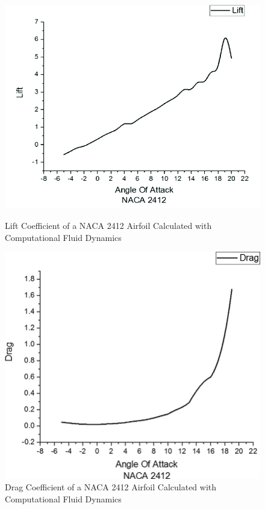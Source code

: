 \documentclass{article}
\begin{document}
\begin{figure}[h]
    \centering
\begin{minipage}[b]{0.45\textwidth}
\centering
\includegraphics[width=\textwidth]{CFD 2412 Lift.png}
\caption{\label{fig:CFD NACA 2412 Lift}Lift Coefficient of a NACA 2412 Airfoil Calculated with Computational Fluid Dynamics}
\end{minipage}
\begin{minipage}[b]{0.45\textwidth}
\centering
\includegraphics[width=\textwidth]{CFD 2412 Drag.png}
\caption{\label{fig:CFD NACA 2412 Drag}Drag Coefficient of a NACA 2412 Airfoil Calculated with Computational Fluid Dynamics}
\end{minipage}
\end{figure}
\end{document}
